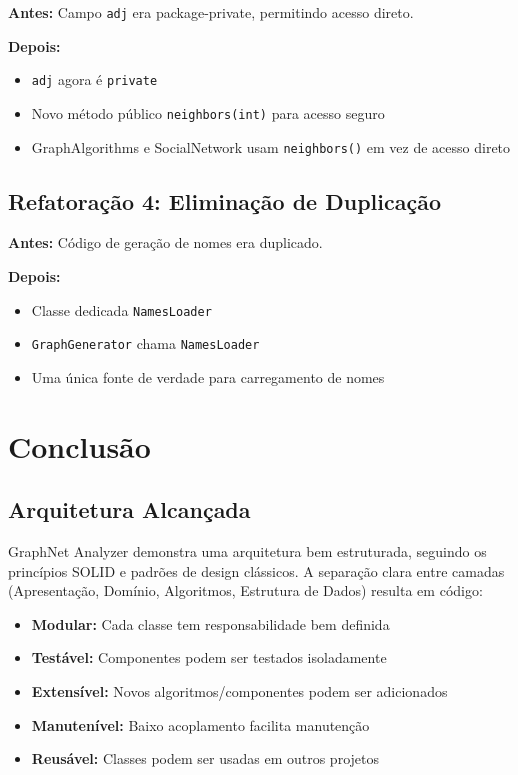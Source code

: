 \documentclass[12pt,a4paper]{article}
\begin{document}
    \textbf{Antes:} Campo \texttt{adj} era package-private, permitindo acesso direto.

    \textbf{Depois:}
    \begin{itemize}
        \item \texttt{adj} agora é \texttt{private}
        \item Novo método público \texttt{neighbors(int)} para acesso seguro
        \item GraphAlgorithms e SocialNetwork usam \texttt{neighbors()} em vez de acesso direto
    \end{itemize}

    \subsection{Refatoração 4: Eliminação de Duplicação}

    \textbf{Antes:} Código de geração de nomes era duplicado.

    \textbf{Depois:}
    \begin{itemize}
        \item Classe dedicada \texttt{NamesLoader}
        \item \texttt{GraphGenerator} chama \texttt{NamesLoader}
        \item Uma única fonte de verdade para carregamento de nomes
    \end{itemize}

    \newpage

    \section{Conclusão}

    \subsection{Arquitetura Alcançada}

    GraphNet Analyzer demonstra uma arquitetura bem estruturada, seguindo os princípios SOLID e padrões de design clássicos. A separação clara entre camadas (Apresentação, Domínio, Algoritmos, Estrutura de Dados) resulta em código:

    \begin{itemize}
        \item \textbf{Modular:} Cada classe tem responsabilidade bem definida
        \item \textbf{Testável:} Componentes podem ser testados isoladamente
        \item \textbf{Extensível:} Novos algoritmos/componentes podem ser adicionados
        \item \textbf{Manutenível:} Baixo acoplamento facilita manutenção
        \item \textbf{Reusável:} Classes podem ser usadas em outros projetos
    \end{itemize}
\end{document}
